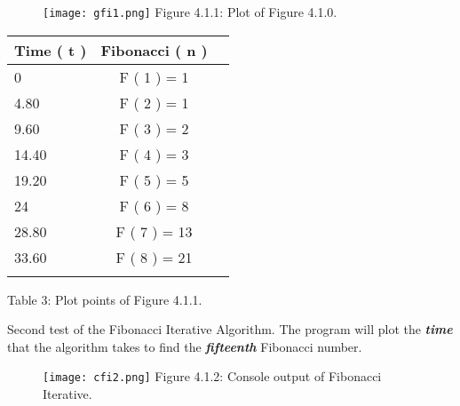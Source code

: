 \documentclass[10pt,a4paper]{article}
\begin{document}
\begin{multicols}{2}
\begin{figure}[H]
\texttt{[image: gfi1.png]}
\centering \linebreak \linebreak Figure 4.1.1: Plot of Figure 4.1.0.
\end{figure}

\begin{center}
\begin{itemize}
\end{itemize}
\begin{tabular}[.5cm]{l c c }
\toprule
Time ( t ) & Fibonacci ( n ) \\
\midrule
0 & F ( 1 ) = 1 \\
\cmidrule{1-2}
4.80 & F ( 2 ) = 1 \\
\cmidrule{1-2}
9.60 & F ( 3 ) = 2 \\
\cmidrule{1-2}
14.40 & F ( 4 ) = 3 \\
\cmidrule{1-2}
19.20 & F ( 5 ) = 5 \\
\cmidrule{1-2}
24 & F ( 6 ) = 8 \\
\cmidrule{1-2}
28.80 & F ( 7 ) = 13 \\
\cmidrule{1-2}
33.60 & F ( 8 ) = 21 \\
\bottomrule
\linebreak
\end{tabular}
\linebreak Table 3: Plot points of Figure 4.1.1.
\end{center}
\end{multicols} \hfill

{\bfseries\itshape\color{OliveGreen}{Observation:}} {\itshape{}} \hfill \break

\pagebreak

Second test of the Fibonacci Iterative Algorithm. The program will plot the {\bfseries\itshape time} that the algorithm takes to find the {\bfseries\itshape fifteenth} Fibonacci number.

\begin{figure}[H]
\texttt{[image: cfi2.png]}
\centering \linebreak \linebreak Figure 4.1.2: Console output of Fibonacci Iterative.
\end{figure}
\end{document}

